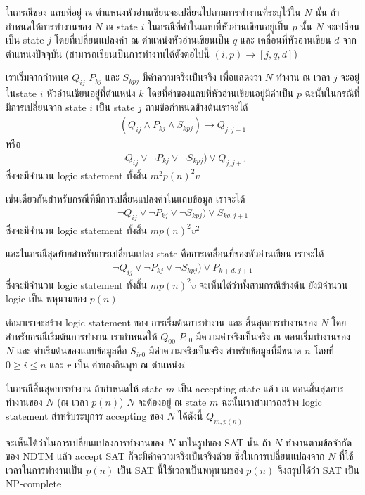 \par{
ในกรณีของ แถบที่อยู่ ณ ตำแหน่งหัวอ่านเขียนจะเปลี่ยนไปตามการทำงานที่ระบุไว้ใน $N$ นั้น ถ้ากำหนดให้การทำงานของ $N$ ณ state $i$ ในกรณีที่ค่าในแถบที่หัวอ่านเขียนอยู่เป็น $p$ นั้น $N$ จะเปลี่ยนเป็น state $j$ โดยที่เปลี่ยนแปลงค่า ณ ตำแหน่งหัวอ่านเขียนเป็น $q$ และ เคลื่อนที่หัวอ่านเขียน $d$ จากตำแหน่งปัจจุบัน (สามารถเขียนเป็นการทำงานได้ดังต่อไปนี้ $(i, p) \rightarrow \left[ j, q, d\right]$)  
}

\par{
เราเริ่มจากกำหนด $Q_{ij}$ $P_{kj}$ และ $S_{kpj}$ มีค่าความจริงเป็นจริง เพื่อแสดงว่า $N$ ทำงาน ณ เวลา $j$ จะอยู่ในstate $i$ หัวอ่านเชียนอยู่ที่ตำแหน่ง $k$ โดยที่ค่าของแถบที่หัวอ่านเขียนอยู่มีค่าเป็น $p$ ฉะนั้นในกรณีที่มีการเปลี่ยนจาก state $i$ เป็น state $j$ ตามข้อกำหนดข้างต้นเราจะได้
%
\begin{eqnarray*}
(Q_{ij} \wedge P_{kj} \wedge S_{kpj}) \rightarrow Q_{j,j+1}
\end{eqnarray*}
%
หรือ
%
\begin{eqnarray*}
\neg Q_{ij} \vee \neg P_{kj} \vee \neg S_{kpj}) \vee Q_{j,j+1}
\end{eqnarray*}
%
ซึ่งจะมีจำนวน logic statement ทั้งสิ้น $m^2p(n)^2v$ 
}

\par{
เช่นเดียวกันสำหรับกรณีที่มีการเปลี่ยนแปลงค่าในแถบข้อมูล เราจะได้
\begin{eqnarray*}
\neg Q_{ij} \vee \neg P_{kj} \vee \neg S_{kpj}) \vee S_{kq,j+1}
\end{eqnarray*}
%
ซึ่งจะมีจำนวน logic statement ทั้งสิ้น $mp(n)^2v^2$ 
}

\par{
และในกรณีสุดท้ายสำหรับการเปลี่ยนแปลง state คือการเคลื่อนที่ของหัวอ่านเขียน เราจะได้
\begin{eqnarray*}
\neg Q_{ij} \vee \neg P_{kj} \vee \neg S_{kpj}) \vee P_{k+d,j+1}
\end{eqnarray*}
%
ซึ่งจะมีจำนวน logic statement ทั้งสิ้น $mp(n)^2v$ จะเห็นได้ว่าทั้งสามกรณีข้างต้น ยังมีจำนวน logic เป็น พหุนามของ $p(n)$ 
}

\par{
ต่อมาเราจะสร้าง logic statement ของ การเริ่มต้นการทำงาน และ สิ้นสุดการทำงานของ $N$ โดยสำหรับกรณีเริ่มต้นการทำงาน เรากำหนดให้ $Q_{00}$ $P_{00}$ มีความค่าจริงเป็นจริง ณ ตอนเริ่มทำงานของ $N$ และ ค่าเริ่มต้นของแถบข้อมูลคือ $S_{ir0}$ มีค่าความจริงเป็นจริง สำหรับข้อมูลที่มีขนาด $n$ โดยที่ $0 \ge i \le n$ และ $r$ เป็น ค่าของอินพุท ณ ตำแหน่ง ​$i$  
}

\par{
ในกรณีสิ้นสุดการทำงาน ถ้ากำหนดให้ state $m$ เป็น accepting state แล้ว ณ ตอนสิ้นสุดการทำงานของ $N$ (ณ เวลา $p(n)$) $N$ จะต้องอยู่ ณ state $m$ ฉะนั้นเราสามารถสร้าง logic statement สำหรับระบุการ accepting ของ $N$ ได้ดังนี้ $Q_{m,p(n)}$
}

\par{
จะเห็นได้ว่าในการเปลี่ยนแปลงการทำงานของ $N$ มาในรูปของ SAT นั้น ถ้า $N$ ทำงานตามข้อจำกัดของ NDTM แล้ว accept SAT ก็จะมีค่าความจริงเป็นจริงด้วย ซึ่งในการเปลี่ยนแปลงจาก $N$ ที่ใช้เวลาในการทำงานเป็น $p(n)$ เป็น SAT นี้ใช้เวลาเป็นพหุนามของ $p(n)$ จึงสรุปได้ว่า SAT เป็น NP-complete 
}

